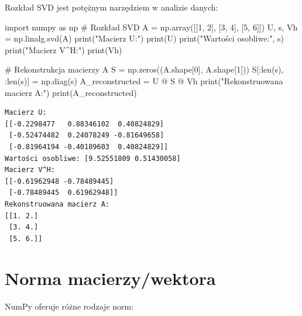 \documentclass[
  polish,
  letterpaper,
  DIV=11,
  numbers=noendperiod]{scrreprt}
\newenvironment{Shaded}{\begin{snugshade}}{\end{snugshade}}
\newcommand{\BuiltInTok}[1]{\textcolor[rgb]{0.00,0.23,0.31}{#1}}
\newcommand{\CommentTok}[1]{\textcolor[rgb]{0.37,0.37,0.37}{#1}}
\newcommand{\DecValTok}[1]{\textcolor[rgb]{0.68,0.00,0.00}{#1}}
\newcommand{\ImportTok}[1]{\textcolor[rgb]{0.00,0.46,0.62}{#1}}
\newcommand{\NormalTok}[1]{\textcolor[rgb]{0.00,0.23,0.31}{#1}}
\newcommand{\OperatorTok}[1]{\textcolor[rgb]{0.37,0.37,0.37}{#1}}
\newcommand{\StringTok}[1]{\textcolor[rgb]{0.13,0.47,0.30}{#1}}
\begin{document}
Rozkład SVD jest potężnym narzędziem w analizie danych:

\begin{Shaded}
\begin{Highlighting}[]
\ImportTok{import}\NormalTok{ numpy }\ImportTok{as}\NormalTok{ np}
\CommentTok{\# Rozkład SVD}
\NormalTok{A }\OperatorTok{=}\NormalTok{ np.array([[}\DecValTok{1}\NormalTok{, }\DecValTok{2}\NormalTok{], [}\DecValTok{3}\NormalTok{, }\DecValTok{4}\NormalTok{], [}\DecValTok{5}\NormalTok{, }\DecValTok{6}\NormalTok{]])}
\NormalTok{U, s, Vh }\OperatorTok{=}\NormalTok{ np.linalg.svd(A)}
\BuiltInTok{print}\NormalTok{(}\StringTok{"Macierz U:"}\NormalTok{)}
\BuiltInTok{print}\NormalTok{(U)}
\BuiltInTok{print}\NormalTok{(}\StringTok{"Wartości osobliwe:"}\NormalTok{, s)}
\BuiltInTok{print}\NormalTok{(}\StringTok{"Macierz V\^{}H:"}\NormalTok{)}
\BuiltInTok{print}\NormalTok{(Vh)}

\CommentTok{\# Rekonstrukcja macierzy A}
\NormalTok{S }\OperatorTok{=}\NormalTok{ np.zeros((A.shape[}\DecValTok{0}\NormalTok{], A.shape[}\DecValTok{1}\NormalTok{]))}
\NormalTok{S[:}\BuiltInTok{len}\NormalTok{(s), :}\BuiltInTok{len}\NormalTok{(s)] }\OperatorTok{=}\NormalTok{ np.diag(s)}
\NormalTok{A\_reconstructed }\OperatorTok{=}\NormalTok{ U }\OperatorTok{@}\NormalTok{ S }\OperatorTok{@}\NormalTok{ Vh}
\BuiltInTok{print}\NormalTok{(}\StringTok{"Rekonstruowana macierz A:"}\NormalTok{)}
\BuiltInTok{print}\NormalTok{(A\_reconstructed)}
\end{Highlighting}
\end{Shaded}

\begin{verbatim}
Macierz U:
[[-0.2298477   0.88346102  0.40824829]
 [-0.52474482  0.24078249 -0.81649658]
 [-0.81964194 -0.40189603  0.40824829]]
Wartości osobliwe: [9.52551809 0.51430058]
Macierz V^H:
[[-0.61962948 -0.78489445]
 [-0.78489445  0.61962948]]
Rekonstruowana macierz A:
[[1. 2.]
 [3. 4.]
 [5. 6.]]
\end{verbatim}

\section{Norma macierzy/wektora}\label{norma-macierzywektora}

NumPy oferuje różne rodzaje norm:
\end{document}
